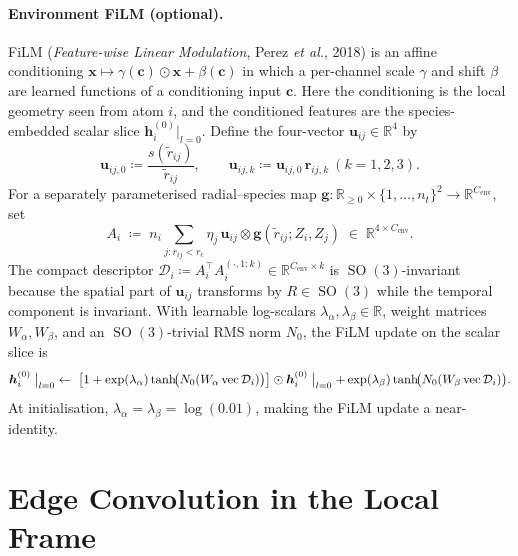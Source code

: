 \documentclass[11pt,a4paper]{article}
\DeclareMathOperator{\SO}{SO}
\newcommand{\R}{\mathbb{R}}
\newcommand{\brh}{\hat{\bm{r}}}
\newcommand{\bx}{\bm{x}}
\newcommand{\bh}{\bm{h}}
\newcommand{\bg}{\bm{g}}
\newcommand{\bu}{\bm{u}}
\newcommand{\rcut}{r_{\mathrm{c}}}
\newcommand{\rtilde}{\widetilde{r}}
\theoremstyle{plain}
\theoremstyle{definition}
\theoremstyle{remark}
\begin{document}
    \paragraph{Environment FiLM (optional).}
    FiLM (\emph{Feature-wise Linear Modulation}, Perez \emph{et al.}, 2018) is an
    affine conditioning $\bx\mapsto\gamma(\bm{c})\odot\bx+\beta(\bm{c})$ in which a
    per-channel scale $\gamma$ and shift $\beta$ are learned functions of a
    conditioning input $\bm{c}$. Here the conditioning is the local geometry seen
    from atom $i$, and the conditioned features are the species-embedded scalar
    slice $\bh_i^{(0)}|_{l=0}$. Define the four-vector $\bu_{ij}\in\R^4$ by
    \begin{equation}\label{eq:utilde}
        \bu_{ij,0}\coloneqq\frac{s(\rtilde_{ij})}{\rtilde_{ij}},\qquad
        \bu_{ij,k}\coloneqq\bu_{ij,0}\,\brh_{ij,k}\ (k=1,2,3).
    \end{equation}
    For a separately parameterised radial--species map $\bg:\R_{\geq 0}\times\{1,\dots,n_t\}^2\to\R^{C_{\mathrm{env}}}$, set
    \begin{equation}
        A_i \;\coloneqq\; n_i\sum_{j:r_{ij}<\rcut}\eta_j\,\bu_{ij}\otimes \bg(\rtilde_{ij};Z_i,Z_j)\;\in\;\R^{4\times C_{\mathrm{env}}}.
    \end{equation}
    The compact descriptor $\mathcal{D}_i\coloneqq A_i^{\top}A_i^{(\cdot,1{:}k)}\in\R^{C_{\mathrm{env}}\times k}$ is $\SO(3)$-invariant because the spatial part of $\bu_{ij}$ transforms by $R\in\SO(3)$ while the temporal component is invariant.
    With learnable log-scalars $\lambda_\alpha,\lambda_\beta\in\R$, weight matrices $W_\alpha,W_\beta$, and an $\SO(3)$-trivial RMS norm $N_0$, the FiLM update on the scalar slice is
    \begin{equation}\label{eq:film}
        \bh_i^{(0)}\bigm|_{l=0}\;\leftarrow\;\bigl[1+\exp(\lambda_\alpha)\tanh\!\bigl(N_0(W_\alpha\,\mathrm{vec}\,\mathcal{D}_i)\bigr)\bigr]\odot\bh_i^{(0)}\bigm|_{l=0}+\exp(\lambda_\beta)\tanh\!\bigl(N_0(W_\beta\,\mathrm{vec}\,\mathcal{D}_i)\bigr).
    \end{equation}
    At initialisation, $\lambda_\alpha=\lambda_\beta=\log(0.01)$, making the FiLM update a near-identity.

    \section{Edge Convolution in the Local Frame}\label{sec:so2conv}
\end{document}
